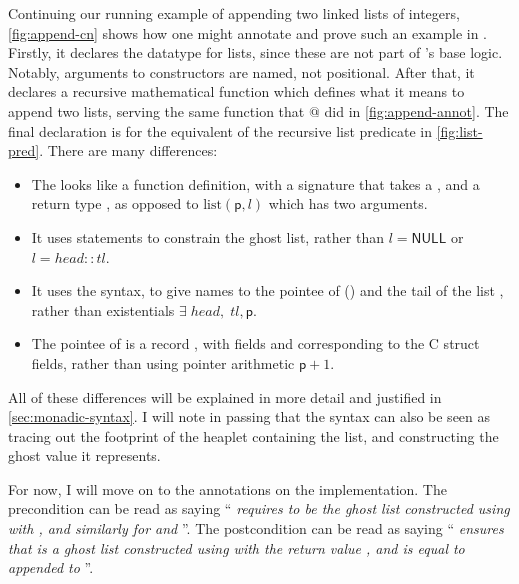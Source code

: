 Continuing our running example of appending two linked lists of
integers, \cref{fig:append-cn} shows how one might annotate and prove such an
example in . Firstly, it declares the datatype for  lists,
since these are not part of 's base logic. Notably, arguments to
constructors are named, not positional. After that, it declares a recursive
\cninline{[rec]} mathematical function  which defines what
it means to append two lists, serving the same function that $@$ did in
\cref{fig:append-annot}. The final  declaration is for the equivalent of
the recursive list predicate in \cref{fig:list-pred}. There are many
differences:
\begin{itemize}
    \item The   looks like a function definition,
        with a signature that takes a , and a
        return type , as opposed to
        $\mathrm{list}(\mathsf{p}, l)$ which has two arguments.
    \item It uses  statements to constrain the ghost list,
        rather than $l = \mathsf{NULL}$ or $l = {head}{:}{:}{tl}$.
    \item It uses the  syntax, to give names to the pointee of
         () and the tail of the list ,
        rather than existentials $\exists{} \; {head}, \; {tl}, \mathsf{p}$.
    \item The pointee of  is a record , with fields
         and  corresponding to the C struct
        fields, rather than using pointer arithmetic $\mathsf{p} + 1$.
\end{itemize}

All of these differences will be explained in more detail and justified in
\cref{sec:monadic-syntax}. I will note in passing that the syntax can also be
seen as tracing out the footprint of the heaplet containing the list, and
constructing the ghost value it represents.

For now, I will move on to the annotations on the implementation. The
precondition can be read as saying ``\emph{ requires
 to be the ghost list constructed using 
with , and similarly for  and }''. The
postcondition can be read as saying ``\emph{ ensures that
 is a ghost list constructed using  with the
return value , and  is equal to 
appended to }''.

